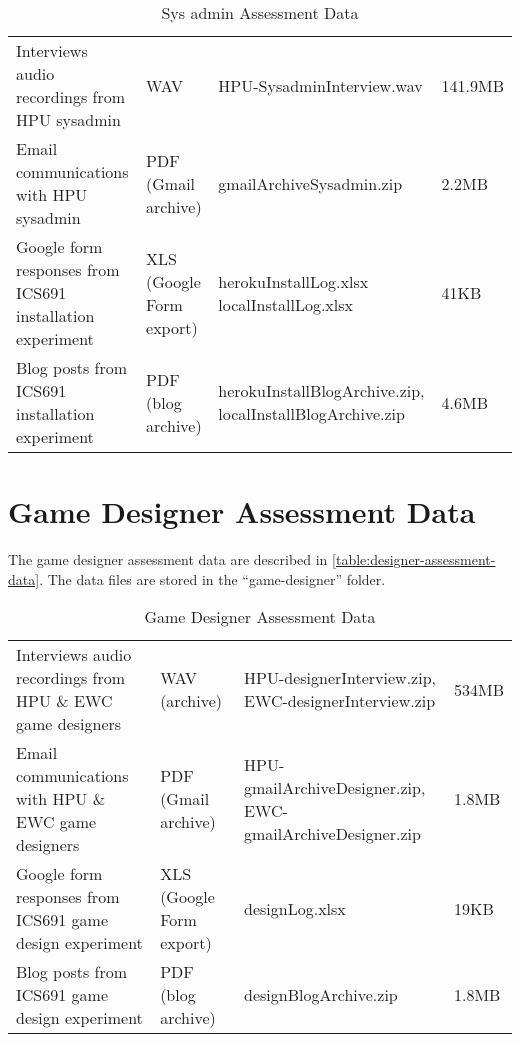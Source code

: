 \begin{table}[ht!]
  \centering
  \begin{tabular}{|p{}|P{0.15\columnwidth}|p{0.3\columnwidth}|p{0.08\columnwidth}|}
    \hline
     &
      & 
     & 
     \\
    \hline
    Interviews audio recordings from HPU sysadmin & WAV & 
    	HPU-SysadminInterview.wav & 141.9MB\\
    \hline
    Email communications with HPU sysadmin & PDF (Gmail archive) & 
    	gmailArchiveSysadmin.zip & 2.2MB \\
    \hline
    Google form responses from ICS691 installation experiment & XLS (Google Form export) & 
        herokuInstallLog.xlsx \newline
        localInstallLog.xlsx & 41KB\\
     \hline
    Blog posts from ICS691 installation experiment & PDF (blog archive) & 
    	herokuInstallBlogArchive.zip, \newline
	localInstallBlogArchive.zip & 4.6MB\\
    \hline
  \end{tabular}
  \caption{Sys admin Assessment Data}
  \label{table:sysadmin-assessment-data}
\end{table}

\section{Game Designer Assessment Data}

The game designer assessment data are described in \autoref{table:designer-assessment-data}. The data files are stored in the ``game-designer'' folder.

\begin{table}[ht!]
  \centering
  \begin{tabular}{|P{0.32\columnwidth}|P{0.15\columnwidth}|p{0.3\columnwidth}|p{0.08\columnwidth}|}
    \hline
     &
      & 
     & 
     \\
    \hline
    Interviews audio recordings from HPU \& EWC game designers & WAV (archive) & 
    	HPU-designerInterview.zip, \newline
	EWC-designerInterview.zip & 534MB\\
    \hline
    Email communications with HPU \& EWC game designers & PDF (Gmail archive) & 
    	HPU-gmailArchiveDesigner.zip, \newline 
	EWC-gmailArchiveDesigner.zip & 1.8MB \\
    \hline
    Google form responses from ICS691 game design experiment & XLS (Google Form export) & 
        designLog.xlsx & 19KB\\
     \hline
    Blog posts from ICS691 game design experiment & PDF (blog archive) & 
    	designBlogArchive.zip & 1.8MB\\
    \hline
  \end{tabular}
  \caption{Game Designer Assessment Data}
  \label{table:designer-assessment-data}
\end{table}

